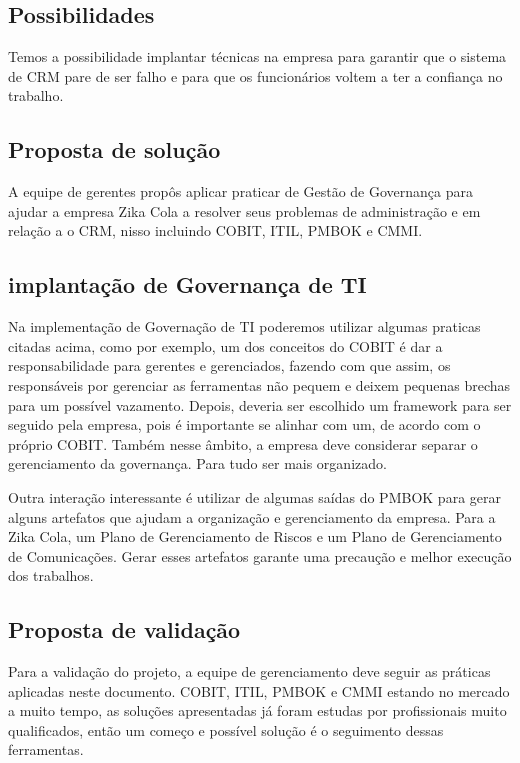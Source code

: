 \documentclass[12pt]{article}
\begin{document}
\subsection{Possibilidades}

Temos a possibilidade implantar técnicas na empresa para garantir que o sistema de CRM pare de ser falho e para que os funcionários voltem a ter a confiança no trabalho.

\subsection{Proposta de solução}

A equipe de gerentes propôs aplicar praticar de Gestão de Governança para ajudar a empresa Zika Cola a resolver seus problemas de administração e em relação a o CRM, nisso incluindo COBIT, ITIL, PMBOK e CMMI.

\subsection{implantação de Governança de TI}

Na implementação de Governação de TI poderemos utilizar algumas praticas citadas acima, como por exemplo, um dos conceitos do COBIT é dar a responsabilidade para gerentes e gerenciados, fazendo com que assim, os responsáveis por gerenciar as ferramentas não pequem e deixem pequenas brechas para um possível vazamento. Depois, deveria ser escolhido um framework para ser seguido pela empresa, pois é importante se alinhar com um, de acordo com o próprio COBIT. Também nesse âmbito, a empresa deve considerar separar o gerenciamento da governança. Para tudo ser mais organizado.

Outra interação interessante é utilizar de algumas saídas do PMBOK para gerar alguns artefatos que ajudam a organização e gerenciamento da empresa. Para a Zika Cola, um Plano de Gerenciamento de Riscos e um Plano de Gerenciamento de Comunicações. Gerar esses artefatos garante uma precaução e melhor execução dos trabalhos.

\subsection{Proposta de validação}

Para a validação do projeto, a equipe de gerenciamento deve seguir as práticas aplicadas neste documento. COBIT, ITIL, PMBOK e CMMI estando no mercado a muito tempo, as soluções apresentadas já foram estudas por profissionais muito qualificados, então um começo e possível solução é o seguimento dessas ferramentas.
\end{document}
